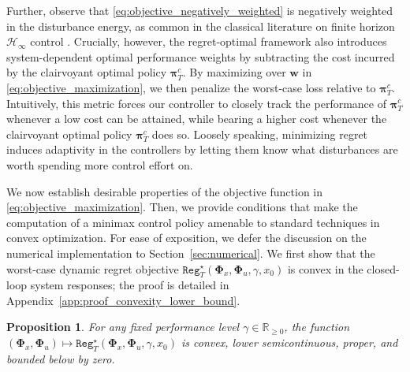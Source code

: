 \documentclass[conference]{IEEEtran}
\newtheorem{proposition}{Proposition}
\begin{document}
Further, observe that \eqref{eq:objective_negatively_weighted} is negatively weighted in the disturbance energy, as common in the classical literature on finite horizon $\mathcal{H}_\infty$ control \cite{james1995robust, green2012linear}. Crucially, however, the regret-optimal framework also introduces system-dependent optimal performance weights by subtracting the cost incurred by the clairvoyant optimal policy $\bm{\pi}^c_T$. By maximizing over $\mathbf{w}$ in \eqref{eq:objective_maximization}, we then penalize the worst-case loss relative to $\bm{\pi}^c_T$. Intuitively, this metric forces our controller to closely track the performance of $\bm{\pi}^c_T$ whenever a low cost can be attained, while bearing a higher cost whenever the clairvoyant optimal policy $\bm{\pi}^c_T$ does so. Loosely speaking, minimizing regret induces adaptivity in the controllers by letting them know what disturbances are worth spending more control effort on.

We now establish desirable properties of the objective function in \eqref{eq:objective_maximization}. Then, we provide conditions that make the computation of a minimax control policy amenable to standard techniques in convex optimization. For ease of exposition, we defer the discussion on the numerical implementation to Section~\ref{sec:numerical}. We first show that the worst-case dynamic regret objective $\mathtt{Reg}_T^\star(\bm{\Phi}_x, \bm{\Phi}_u, \gamma, x_0)$ is convex in the closed-loop system responses; the proof is detailed in Appendix~\ref{app:proof_convexity_lower_bound}.
\begin{proposition}
    \label{prop:convexity_lower_bound}
    For any fixed performance level $\gamma \in \mathbb{R}_{\geq 0}$, the function $(\bm{\Phi}_x, \bm{\Phi}_u) \mapsto \mathtt{Reg}_T^\star(\bm{\Phi}_x, \bm{\Phi}_u, \gamma, x_0)$ is convex, lower semicontinuous, proper, and bounded below by zero.
\end{proposition}
\end{document}
